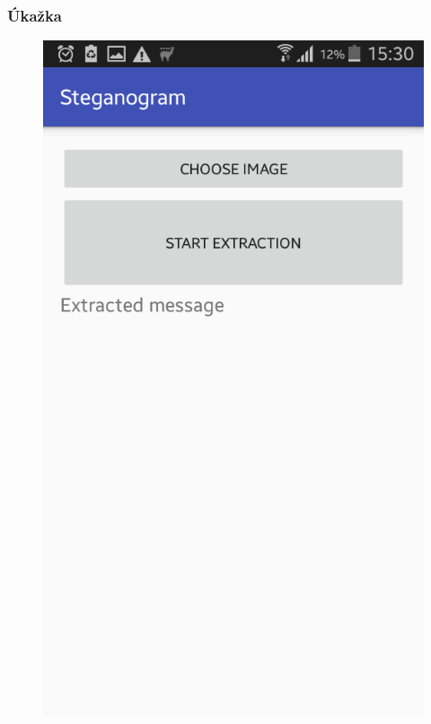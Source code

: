 \documentclass{beamer}
\begin{document}
\begin{frame}
    \frametitle{Úkažka}
    \begin{figure}
    \centerline{\includegraphics[height=0.8 \textheight]{images/screen_6.png}}
    
    \end{figure}
\end{frame}
\end{document}
